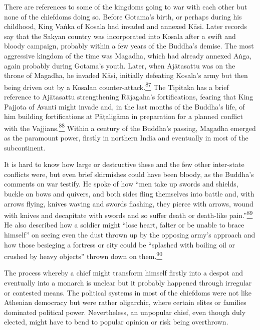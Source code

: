 There are references to some of the kingdoms going to war with each
other but none of the chiefdoms doing so. Before Gotama's birth, or
perhaps during his childhood, King Vaṅka of Kosala had invaded and
annexed Kāsi. Later records say that the Sakyan country was incorporated
into Kosala after a swift and bloody campaign, probably within a few
years of the Buddha's demise. The most aggressive kingdom of the time
was Magadha, which had already annexed Aṅga, again probably during
Gotama's youth. Later, when Ajātasattu was on the throne of Magadha, he
invaded Kāsi, initially defeating Kosala's army but then being driven
out by a Kosalan
counter-attack.\label{footprints_split_006.html_fnref87}\hyperref[footprints_split_024.htmlux5cux23fn87]{\textsuperscript{87}}
The Tipitaka has a brief reference to Ajātasattu strengthening
Rājagaha's fortifications, fearing that King Pajjota of Avanti might
invade and, in the last months of the Buddha's life, of him building
fortifications at Pāṭaligāma in preparation for a planned conflict with
the
Vajjians.\label{footprints_split_006.html_fnref88}\hyperref[footprints_split_024.htmlux5cux23fn88]{\textsuperscript{88}}
Within a century of the Buddha's passing, Magadha emerged as the
paramount power, firstly in northern India and eventually in most of the
subcontinent.

It is hard to know how large or destructive these and the few other
inter-state conflicts were, but even brief skirmishes could have been
bloody, as the Buddha's comments on war testify. He spoke of how ``men
take up swords and shields, buckle on bows and quivers, and both sides
fling themselves into battle and, with arrows flying, knives waving and
swords flashing, they pierce with arrows, wound with knives and
decapitate with swords and so suffer death or death-like
pain.''\label{footprints_split_006.html_fnref89}\hyperref[footprints_split_024.htmlux5cux23fn89]{\textsuperscript{89}}
He also described how a soldier might ``lose heart, falter or be unable
to brace himself'' on seeing even the dust thrown up by the opposing
army's approach and how those besieging a fortress or city could be
``splashed with boiling oil or crushed by heavy objects'' thrown down on
them.\label{footprints_split_006.html_fnref90}\hyperref[footprints_split_024.htmlux5cux23fn90]{\textsuperscript{90}}

The process whereby a chief might transform himself firstly into a
despot and eventually into a monarch is unclear but it probably happened
through irregular or contested means. The political systems in most of
the chiefdoms were not like Athenian democracy but were rather
oligarchic, where certain elites or families dominated political power.
Nevertheless, an unpopular chief, even though duly elected, might have
to bend to popular opinion or risk being overthrown.

